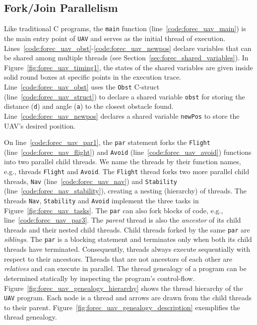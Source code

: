 
\subsection{Fork/Join Parallelism}
Like traditional C programs, the \verb$main$ function 
(line~\ref{code:forec_uav_main}) is the main 
entry point of \verb$UAV$ and serves as the initial
thread of execution. Lines~\ref{code:forec_uav_obst}-\ref{code:forec_uav_newpos}
declare variables that can be shared among multiple 
threads (see Section~\ref{sec:forec_shared_variables}).
In Figure~\ref{fig:forec_uav_timing1}, the states of 
the shared variables are given inside solid round
boxes at specific points in the execution trace.
Line~\ref{code:forec_uav_obst} uses the \verb$Obst$ C-struct
(line~\ref{code:forec_uav_struct}) to declare a shared
variable \verb$obst$ for storing the distance (\verb$d$) and
angle (\verb$a$) to the closest obstacle found.
Line~\ref{code:forec_uav_newpos} declares a shared variable
\verb$newPos$ to store the UAV's desired position. 

On line~\ref{code:forec_uav_par1}, the \verb$par$ statement
forks the \verb$Flight$ (line~\ref{code:forec_uav_flight})
and \verb$Avoid$ (line~\ref{code:forec_uav_avoid}) functions
into two parallel child threads. We name the threads by
their function names, e.g., threads \verb$Flight$ and
\verb$Avoid$. The \verb$Flight$ thread forks two more
parallel child threads, \verb$Nav$
(line~\ref{code:forec_uav_nav}) and \verb$Stability$
(line~\ref{code:forec_uav_stability}), creating a nesting
(hierarchy) of threads. The threads \verb$Nav$,
\verb$Stability$ and \verb$Avoid$ implement the three tasks
in Figure~\ref{fig:forec_uav_tasks}. The \verb$par$ can also
fork blocks of code, e.g., line~\ref{code:forec_uav_par3}.
The \emph{parent} thread is also the \emph{ancestor} of its 
child threads and their nested child threads.
Child threads forked by the same
\verb$par$ are \emph{siblings}. The \verb$par$ is
a blocking statement and terminates only when both its child
threads have terminated. Consequently, threads always
execute sequentially with respect to their ancestors.
Threads that are not ancestors of each other are
\emph{relatives} and can execute in parallel. The thread
genealogy of a program can be determined statically by
inspecting the program's control-flow.
Figure~\ref{fig:forec_uav_genealogy_hierarchy} shows the
thread hierarchy of the \verb$UAV$ program. Each node is a
thread and arrows are drawn from the child threads to their
parent. Figure~\ref{fig:forec_uav_genealogy_description}
exemplifies the thread genealogy.


